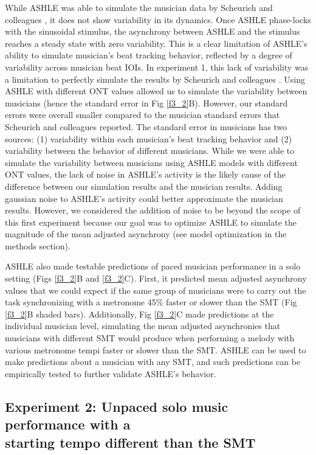 \documentclass{report}
\begin{document}
While ASHLE was able to simulate the musician data by Scheurich and colleagues \cite{scheurich2018tapping}, it does not show variability in its dynamics. Once ASHLE phase-locks with the sinusoidal stimulus, the asynchrony between ASHLE and the stimulus reaches a steady state with zero variability. This is a clear limitation of ASHLE's ability to simulate musician's beat tracking behavior, reflected by a degree of variability across musician beat IOIs. In experiment 1, this lack of variability was a limitation to perfectly simulate the results by Scheurich and colleagues \cite{scheurich2018tapping}. Using ASHLE with different ONT values allowed us to simulate the variability between musicians (hence the standard error in Fig \ref{f3_2}B). However, our standard errors were overall smaller compared to the musician standard errors that Scheurich and colleagues \cite{scheurich2018tapping} reported. The standard error in musicians has two sources: (1) variability within each musician's beat tracking behavior and (2) variability between the behavior of different musicians. While we were able to simulate the variability between musicians using ASHLE models with different ONT values, the lack of noise in ASHLE's activity is the likely cause of the difference between our simulation results and the musician results. Adding gaussian noise to ASHLE's activity could better approximate the musician results. However, we considered the addition of noise to be beyond the scope of this first experiment because our goal was to optimize ASHLE to simulate the magnitude of the mean adjusted asynchrony (see model optimization in the methods section).

ASHLE also made testable predictions of paced musician performance in a solo setting (Figs \ref{f3_2}B and \ref{f3_2}C). First, it predicted mean adjusted asynchrony values that we could expect if the same group of musicians were to carry out the task synchronizing with a metronome 45\% faster or slower than the SMT (Fig \ref{f3_2}B shaded bars). Additionally, Fig \ref{f3_2}C made predictions at the individual musician level, simulating the mean adjusted asynchronies that musicians with different SMT would produce when performing a melody with various metronome tempi faster or slower than the SMT. ASHLE can be used to make predictions about a musician with any SMT, and such predictions can be empirically tested to further validate ASHLE's behavior.

\subsection{Experiment 2: Unpaced solo music performance with a \\ starting tempo different than the SMT}
\end{document}
